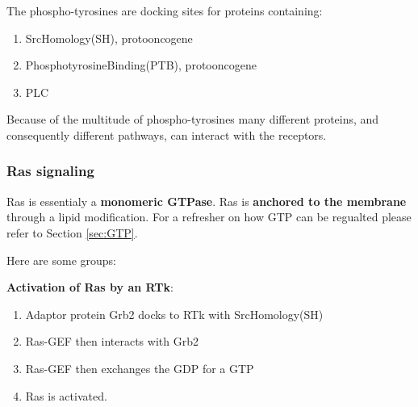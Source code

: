 \documentclass[../main.tex]{subfiles}
\begin{document}
The phospho-tyrosines are docking sites for proteins containing:
\begin{enumerate}
	\item \gls{SrcHomology(SH)}, \gls{protooncogene}
	\item \gls{PhosphotyrosineBinding(PTB)}, \gls{protooncogene}
	\item \gls{PLC} 
\end{enumerate}

Because of the multitude of phospho-tyrosines many different proteins, and consequently different pathways, can interact with the receptors.

\subsubsection{Ras signaling}

\gls{Ras} is essentialy a \textbf{monomeric GTPase}. Ras is \textbf{anchored to the membrane} through a lipid modification. For a refresher on how GTP can be regualted please refer to Section \ref{sec:GTP}.

Here are some groups:
\begin{figure}[H]
	\centering
	
\end{figure}

\textbf{Activation of Ras by an  RTk}: 
\begin{enumerate}
	\item Adaptor protein \gls{Grb2} docks to RTk with \gls{SrcHomology(SH)}
	\item Ras-GEF then interacts with Grb2
	\item Ras-GEF then exchanges the GDP for a GTP
	\item Ras is activated.
\end{enumerate}
\end{document}
